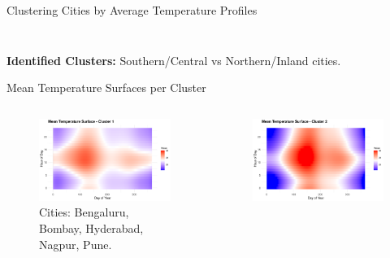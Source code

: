\documentclass[svgnames, 12pt]{beamer}
\begin{document}
\begin{frame}{Clustering Cities by Average Temperature Profiles}
\begin{columns}[T]
\begin{column}{0.5\textwidth}
\begin{figure}
      \end{figure}
    \end{column}
  \end{columns}
  \textbf{Identified Clusters:} Southern/Central vs Northern/Inland cities.
\end{frame}

\begin{frame}{Mean Temperature Surfaces per Cluster}
  \begin{columns}[T]
    \begin{column}{0.5\textwidth}
      \begin{figure}
        \includegraphics[width=\linewidth]{../data/output/figures/mean_surface_cluster_1.png}
        \caption*{\tiny Cities: Bengaluru, Bombay, Hyderabad, Nagpur, Pune.}
      \end{figure}
    \end{column}
    \begin{column}{0.5\textwidth}
      \begin{figure}
        \includegraphics[width=\linewidth]{../data/output/figures/mean_surface_cluster_2.png}

\end{figure}
\end{column}
\end{columns}
\end{frame}
\end{document}

